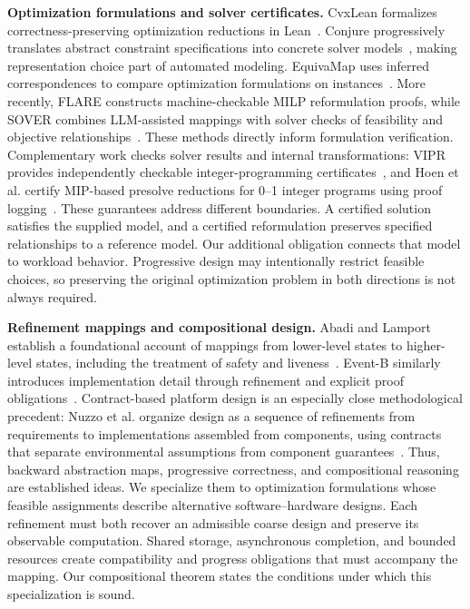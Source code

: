 \documentclass[11pt]{article}
\begin{document}
\textbf{Optimization formulations and solver certificates.}
CvxLean formalizes correctness-preserving optimization reductions in Lean~\cite{cvxlean}. Conjure progressively translates abstract constraint specifications into concrete solver models~\cite{conjure}, making representation choice part of automated modeling. EquivaMap uses inferred correspondences to compare optimization formulations on instances~\cite{equivamap}. More recently, FLARE constructs machine-checkable MILP reformulation proofs, while SOVER combines LLM-assisted mappings with solver checks of feasibility and objective relationships~\cite{flare,sover}. These methods directly inform formulation verification. Complementary work checks solver results and internal transformations: VIPR provides independently checkable integer-programming certificates~\cite{vipr}, and Hoen et al. certify MIP-based presolve reductions for 0--1 integer programs using proof logging~\cite{presolve}. These guarantees address different boundaries. A certified solution satisfies the supplied model, and a certified reformulation preserves specified relationships to a reference model. Our additional obligation connects that model to workload behavior. Progressive design may intentionally restrict feasible choices, so preserving the original optimization problem in both directions is not always required.

\textbf{Refinement mappings and compositional design.}
Abadi and Lamport establish a foundational account of mappings from lower-level states to higher-level states, including the treatment of safety and liveness~\cite{refinementmaps}. Event-B similarly introduces implementation detail through refinement and explicit proof obligations~\cite{eventb}. Contract-based platform design is an especially close methodological precedent: Nuzzo et al. organize design as a sequence of refinements from requirements to implementations assembled from components, using contracts that separate environmental assumptions from component guarantees~\cite{contracts}. Thus, backward abstraction maps, progressive correctness, and compositional reasoning are established ideas. We specialize them to optimization formulations whose feasible assignments describe alternative software--hardware designs. Each refinement must both recover an admissible coarse design and preserve its observable computation. Shared storage, asynchronous completion, and bounded resources create compatibility and progress obligations that must accompany the mapping. Our compositional theorem states the conditions under which this specialization is sound.
\end{document}
